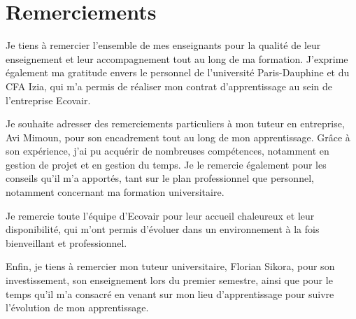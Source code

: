 \section*{Remerciements}
Je tiens à remercier l’ensemble de mes enseignants pour la qualité de leur enseignement et leur accompagnement tout au long de ma formation. J’exprime également ma gratitude envers le personnel de l’université Paris-Dauphine et du CFA Izia, qui m’a permis de réaliser mon contrat d’apprentissage au sein de l’entreprise Ecovair.

Je souhaite adresser des remerciements particuliers à mon tuteur en entreprise, Avi Mimoun, pour son encadrement tout au long de mon apprentissage. Grâce à son expérience, j’ai pu acquérir de nombreuses compétences, notamment en gestion de projet et en gestion du temps. Je le remercie également pour les conseils qu’il m’a apportés, tant sur le plan professionnel que personnel, notamment concernant ma formation universitaire.

Je remercie toute l’équipe d’Ecovair pour leur accueil chaleureux et leur disponibilité, qui m’ont permis d’évoluer dans un environnement à la fois bienveillant et professionnel.

Enfin, je tiens à remercier mon tuteur universitaire, Florian Sikora, pour son investissement, son enseignement lors du premier semestre, ainsi que pour le temps qu’il m’a consacré en venant sur mon lieu d’apprentissage pour suivre l’évolution de mon apprentissage.